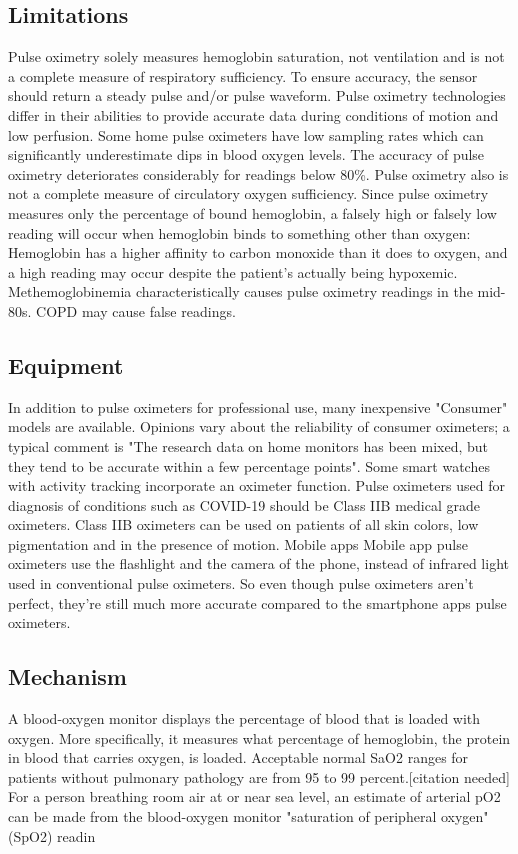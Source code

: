 \documentclass[12pt]{article}
\begin{document}
\subsection{Limitations}
Pulse oximetry solely measures hemoglobin saturation, not ventilation and is not a complete measure of respiratory sufficiency.
To ensure accuracy, the sensor should return a steady pulse and/or pulse waveform.
Pulse oximetry technologies differ in their abilities to provide accurate data during conditions of motion and low perfusion.
Some home pulse oximeters have low sampling rates which can significantly underestimate dips in blood oxygen levels.
The accuracy of pulse oximetry deteriorates considerably for readings below 80\%. Pulse oximetry also is not a complete measure of circulatory oxygen sufficiency.
Since pulse oximetry measures only the percentage of bound hemoglobin, a falsely high or falsely low reading will occur when hemoglobin binds to something other than oxygen: Hemoglobin has a higher affinity to carbon monoxide than it does to oxygen, and a high reading may occur despite the patient's actually being hypoxemic.
Methemoglobinemia characteristically causes pulse oximetry readings in the mid-80s. COPD may cause false readings.
\subsection{Equipment}
In addition to pulse oximeters for professional use, many inexpensive "Consumer" models are available.
Opinions vary about the reliability of consumer oximeters; a typical comment is "The research data on home monitors has been mixed, but they tend to be accurate within a few percentage points".
Some smart watches with activity tracking incorporate an oximeter function.
Pulse oximeters used for diagnosis of conditions such as COVID-19 should be Class IIB medical grade oximeters.
Class IIB oximeters can be used on patients of all skin colors, low pigmentation and in the presence of motion.
Mobile apps Mobile app pulse oximeters use the flashlight and the camera of the phone, instead of infrared light used in conventional pulse oximeters.
So even though pulse oximeters aren't perfect, they're still much more accurate compared to the smartphone apps pulse oximeters.

\subsection{Mechanism}
A blood-oxygen monitor displays the percentage of blood that is loaded with oxygen. More specifically, it measures what percentage of hemoglobin, the protein in blood that carries oxygen, is loaded. Acceptable normal SaO2 ranges for patients without pulmonary pathology are from 95 to 99 percent.[citation needed] For a person breathing room air at or near sea level, an estimate of arterial pO2 can be made from the blood-oxygen monitor "saturation of peripheral oxygen" (SpO2) readin
\end{document}
